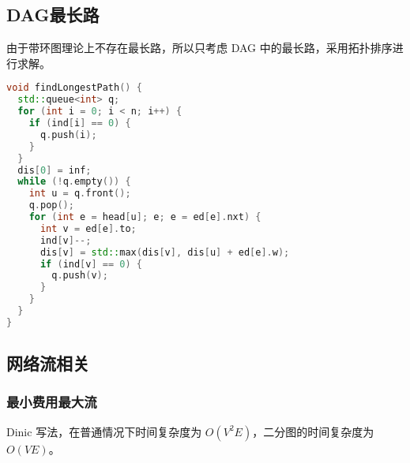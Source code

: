 \documentclass[a4paper,10pt]{article}
\begin{document}
\subsection{DAG最长路}
由于带环图理论上不存在最长路，所以只考虑 DAG 中的最长路，采用拓扑排序进行求解。
\begin{lstlisting}[language=c++]
void findLongestPath() {
  std::queue<int> q; 
  for (int i = 0; i < n; i++) {
    if (ind[i] == 0) {
      q.push(i); 
    }
  }
  dis[0] = inf; 
  while (!q.empty()) {
    int u = q.front(); 
    q.pop();
    for (int e = head[u]; e; e = ed[e].nxt) {
      int v = ed[e].to;
      ind[v]--; 
      dis[v] = std::max(dis[v], dis[u] + ed[e].w);
      if (ind[v] == 0) {
        q.push(v); 
      }
    }
  }
}
\end{lstlisting}

\newpage
\subsection{网络流相关}

\subsubsection{最小费用最大流}
Dinic 写法，在普通情况下时间复杂度为 $O(V^2E)$，二分图的时间复杂度为 $O(VE)$。
\end{document}
